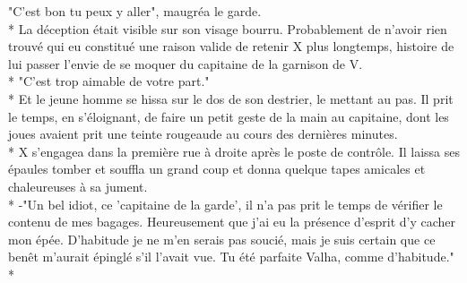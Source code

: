 \documentclass{book}
\begin{document}
"C'est bon tu peux y aller", maugréa le garde.\\*
La déception était visible sur son visage bourru. Probablement de n'avoir rien trouvé qui eu constitué une raison valide de retenir X plus longtemps, histoire de lui passer l'envie de se moquer du capitaine de la garnison de V.\\*
"C'est trop aimable de votre part."\\*
Et le jeune homme se hissa sur le dos de son destrier, le mettant au pas. Il prit le temps, en s'éloignant, de faire un petit geste de la main au capitaine, dont les joues avaient prit une teinte rougeaude au cours des dernières minutes.\\*
X s'engagea dans la première rue à droite après le poste de contrôle. Il laissa ses épaules tomber et souffla un grand coup et donna quelque tapes amicales et chaleureuses à sa jument.\\*
-"Un bel idiot, ce 'capitaine de la garde', il n'a pas prit le temps de vérifier le contenu de mes bagages. Heureusement que j'ai eu la présence d'esprit d'y cacher mon épée. D'habitude je ne m'en serais pas soucié, mais je suis certain que ce benêt  m'aurait épinglé s'il l'avait vue. Tu été parfaite Valha, comme d'habitude."\\*
\end{document}
